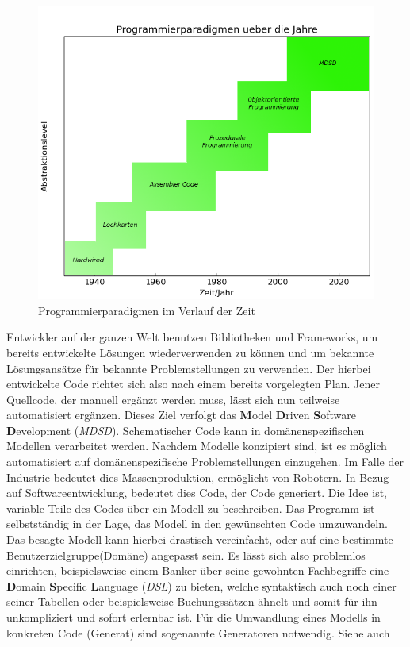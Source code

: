 \begin{figure}[h]
	\begin{center}
		\includegraphics[width = \textwidth]{Bilder/paradigmsInTime(matplotlib).png}
		\caption{Programmierparadigmen im Verlauf der Zeit}
		\label{paradigmnsintime}
	\end{center}
\end{figure}Entwickler auf der ganzen Welt benutzen Bibliotheken und Frameworks, um bereits entwickelte Lösungen wiederverwenden zu können und um bekannte Lösungsansätze für bekannte Problemstellungen zu verwenden. Der hierbei entwickelte Code richtet sich also nach einem bereits vorgelegten Plan. Jener Quellcode, der manuell ergänzt werden muss, lässt sich nun teilweise automatisiert ergänzen.  Dieses Ziel verfolgt das \textbf{M}odel \textbf{D}riven \textbf{S}oftware \textbf{D}evelopment (\textit{MDSD}). Schematischer Code kann in domänenspezifischen Modellen verarbeitet werden. Nachdem Modelle konzipiert sind, ist es möglich automatisiert auf domänenspezifische Problemstellungen einzugehen. Im Falle der Industrie bedeutet dies Massenproduktion, ermöglicht von Robotern. In Bezug auf Softwareentwicklung, bedeutet dies Code, der Code generiert. Die Idee ist, variable Teile des Codes über ein Modell zu beschreiben. Das Programm ist selbstständig in der Lage, das Modell in den gewünschten Code umzuwandeln. Das besagte Modell kann hierbei drastisch vereinfacht, oder auf eine bestimmte Benutzerzielgruppe(Domäne) angepasst sein. Es lässt sich also problemlos einrichten, beispielsweise einem Banker über seine gewohnten Fachbegriffe eine \textbf{D}omain \textbf{S}pecific \textbf{L}anguage (\textit{DSL}) zu bieten, welche syntaktisch auch noch einer seiner Tabellen oder beispielsweise Buchungssätzen ähnelt und somit für ihn unkompliziert und sofort erlernbar ist. Für die Umwandlung eines Modells in konkreten Code (Generat) sind sogenannte Generatoren notwendig. 
\linebreak 
Siehe auch 

